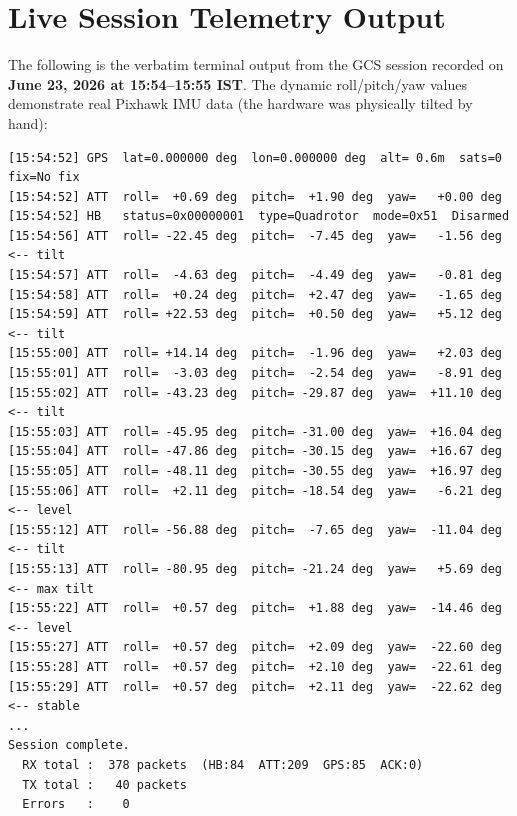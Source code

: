\documentclass[11pt,a4paper]{article}
\begin{document}
\newpage

\section{Live Session Telemetry Output}
\label{sec:liveoutput}

The following is the verbatim terminal output from the GCS session recorded on
\textbf{June 23, 2026 at 15:54--15:55 IST}. The dynamic roll/pitch/yaw values
demonstrate real Pixhawk IMU data (the hardware was physically tilted by hand):

\begin{lstlisting}[language={}, basicstyle=\ttfamily\tiny, frame=single,
    caption={Verbatim GCS Session Output -- June 23, 2026}]
[15:54:52] GPS  lat=0.000000 deg  lon=0.000000 deg  alt= 0.6m  sats=0  fix=No fix
[15:54:52] ATT  roll=  +0.69 deg  pitch=  +1.90 deg  yaw=   +0.00 deg
[15:54:52] HB   status=0x00000001  type=Quadrotor  mode=0x51  Disarmed
[15:54:56] ATT  roll= -22.45 deg  pitch=  -7.45 deg  yaw=   -1.56 deg   <-- tilt
[15:54:57] ATT  roll=  -4.63 deg  pitch=  -4.49 deg  yaw=   -0.81 deg
[15:54:58] ATT  roll=  +0.24 deg  pitch=  +2.47 deg  yaw=   -1.65 deg
[15:54:59] ATT  roll= +22.53 deg  pitch=  +0.50 deg  yaw=   +5.12 deg   <-- tilt
[15:55:00] ATT  roll= +14.14 deg  pitch=  -1.96 deg  yaw=   +2.03 deg
[15:55:01] ATT  roll=  -3.03 deg  pitch=  -2.54 deg  yaw=   -8.91 deg
[15:55:02] ATT  roll= -43.23 deg  pitch= -29.87 deg  yaw=  +11.10 deg   <-- tilt
[15:55:03] ATT  roll= -45.95 deg  pitch= -31.00 deg  yaw=  +16.04 deg
[15:55:04] ATT  roll= -47.86 deg  pitch= -30.15 deg  yaw=  +16.67 deg
[15:55:05] ATT  roll= -48.11 deg  pitch= -30.55 deg  yaw=  +16.97 deg
[15:55:06] ATT  roll=  +2.11 deg  pitch= -18.54 deg  yaw=   -6.21 deg   <-- level
[15:55:12] ATT  roll= -56.88 deg  pitch=  -7.65 deg  yaw=  -11.04 deg   <-- tilt
[15:55:13] ATT  roll= -80.95 deg  pitch= -21.24 deg  yaw=   +5.69 deg   <-- max tilt
[15:55:22] ATT  roll=  +0.57 deg  pitch=  +1.88 deg  yaw=  -14.46 deg   <-- level
[15:55:27] ATT  roll=  +0.57 deg  pitch=  +2.09 deg  yaw=  -22.60 deg
[15:55:28] ATT  roll=  +0.57 deg  pitch=  +2.10 deg  yaw=  -22.61 deg
[15:55:29] ATT  roll=  +0.57 deg  pitch=  +2.11 deg  yaw=  -22.62 deg   <-- stable
...
Session complete.
  RX total :  378 packets  (HB:84  ATT:209  GPS:85  ACK:0)
  TX total :   40 packets
  Errors   :    0
\end{lstlisting}
\end{document}
